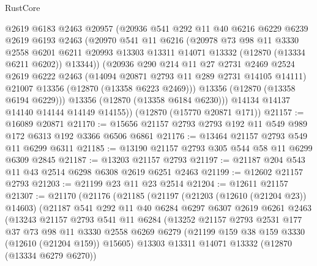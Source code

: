 \begin{lexlean}{RustCore}
\begin{coremodule}
          @2619
          @6183
          @2463
          @20957
          (@20936
            @541
            @292
            @11
            @40
            @6216
            @6229
            @6239
            @2619
            @6193
            @2463
            (@20970
              @541
              @11
              @6216
              (@20978
                @73
                @98
                @11
                @3330
                @2558
                @6201
                @6211
                @20993
                @13303
                @13311
                @14071
                @13332
                (@12870 (@13334 @6211 @6202))
                @13344))
            (@20936
              @290
              @214
              @11
              @27
              @2731
              @2469
              @2524
              @2619
              @6222
              @2463
              (@14094 @20871 @2793 @11 @289 @2731 @14105 @14111)
              @21007
              @13356
              (@12870 (@13358 @6223 @2469)))
            @13356
            (@12870 (@13358 @6194 @6229)))
          @13356
          (@12870 (@13358 @6184 @6230)))
        @14134
        @14137
        @14140
        @14144
        @14149
        @14155))
    (@12870 (@15770 @20871 @171))
@21157 := @16089 @20871
@21170 := @15656 @21157 @2793 @2793 @192 @11 @549 @989 @172 @6313 @192 @3366 @6506 @6861
@21176 := @13464 @21157 @2793 @549 @11 @6299 @6311
@21185 := @13190 @21157 @2793 @305 @544 @58 @11 @6299 @6309 @2845
@21187 := @13203 @21157 @2793
@21197 := @21187 @204 @543 @11 @43 @2514 @6298 @6308 @2619 @6251 @2463
@21199 := @12602 @21157 @2793
@21203 := @21199 @23 @11 @23 @2514
@21204 := @12611 @21157
@21307 := @21170
    (@21176
      (@21185
        (@21197
          (@21203 (@12610 (@21204 @23)) @14603)
          (@21187
            @541
            @292
            @11
            @40
            @6284
            @6297
            @6307
            @2619
            @6261
            @2463
            (@13243
              @21157
              @2793
              @541
              @11
              @6284
              (@13252
                @21157
                @2793
                @2531
                @177
                @37
                @73
                @98
                @11
                @3330
                @2558
                @6269
                @6279
                (@21199 @159 @38 @159 @3330 (@12610 (@21204 @159)) @15605)
                @13303
                @13311
                @14071
                @13332
                (@12870 (@13334 @6279 @6270))

\end{coremodule}
\end{lexlean}
